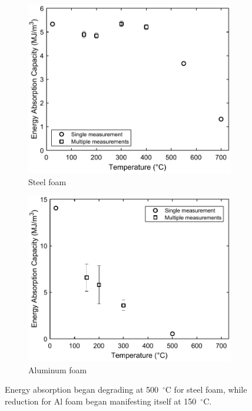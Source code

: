 \documentclass[review]{elsarticle}
\begin{document}
\begin{figure}
	\centering
	\begin{subfigure}{0.50\textwidth}
		\centering
		\includegraphics[width=0.90\linewidth]
		{Tex-Figures/Fig21a-EnergyCapacity-Fe.pdf}
		\caption{Steel foam}
		\label{fig:energyCapacity_Steel}
	\end{subfigure}%
	\begin{subfigure}{0.50\textwidth}
		\centering
		\includegraphics[width=0.90\linewidth]
		{Tex-Figures/Fig21b-EnergyCapacity-Al.pdf}
		\caption{Aluminum foam}
		\label{fig:energyCapacity_Al}
	\end{subfigure}
	\caption{ Energy absorption began degrading at 500~$^{\circ}\mathrm{C}$ for steel foam, while reduction for Al foam began manifesting itself at 150~$^{\circ}\mathrm{C}$.}
	\label{fig:energyCapacity}
\end{figure}
\end{document}
